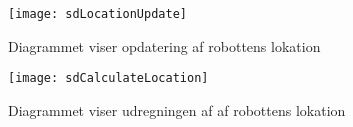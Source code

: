 
\begin{figure}[H]
\centering \texttt{[image: sdLocationUpdate]}
\label{img:locUpdate}
\caption{Diagrammet viser opdatering af robottens lokation}
\end{figure} 


\begin{figure}[H]
\centering \texttt{[image: sdCalculateLocation]}
\label{img:calcLoc}
\caption{Diagrammet viser udregningen af af robottens lokation}
\end{figure}


